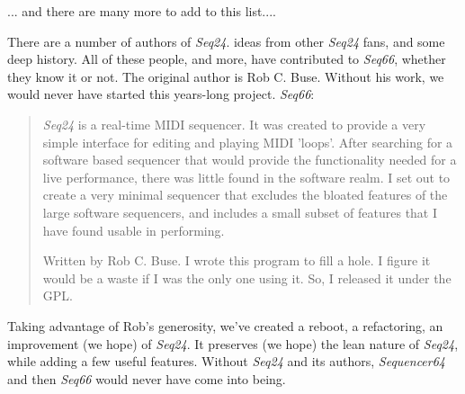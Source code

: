    ... and there are many more to add to this list....

   There are a number of authors of \textsl{Seq24}.
   ideas from other \textsl{Seq24} fans,
   and some deep history.
   All of these people, and more, have contributed to \textsl{Seq66},
   whether they know it or not.
   The original author is Rob C. Buse.
   Without his work, we would never have started this years-long project.
   \textsl{Seq66}:

   \begin{quotation}
      \textsl{Seq24} is a real-time MIDI sequencer. It was created to
      provide a very simple interface for editing and playing MIDI 'loops'.
      After searching for a software based sequencer that would provide the
      functionality needed for a live performance, there was little found in
      the software realm. I set out to create a very minimal sequencer that
      excludes the bloated features of the large software sequencers, and
      includes a small subset of features that I have found usable in
      performing. 

      Written by Rob C. Buse.  I wrote this program to fill a
      hole.  I figure it would be a waste if I was the only one
      using it.  So, I released it under the GPL.
   \end{quotation}

   Taking advantage of Rob's generosity,
   we've created a reboot, a refactoring, an improvement (we hope) of
   \textsl{Seq24}.  It preserves (we hope) the lean nature of \textsl{Seq24},
   while adding a few useful features.
   Without \textsl{Seq24} and its authors,
   \textsl{Sequencer64} and then \textsl{Seq66} would never have come into
   being.

